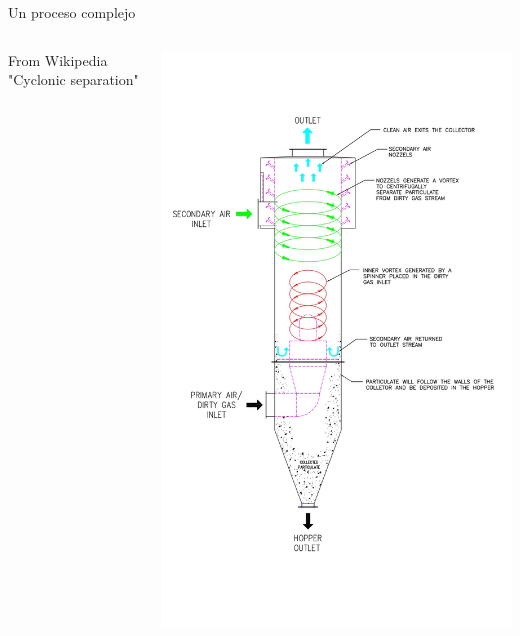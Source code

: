 \documentclass[presentation,aspectratio=169]{beamer}
\begin{document}
\begin{frame}[label={sec:orga68fad4}]{Un proceso complejo}
\begin{columns}
\begin{column}{0.6\columnwidth}
From Wikipedia "Cyclonic separation"
\end{column}
\begin{column}{0.4\columnwidth}
\begin{center}
\includegraphics[height=1.0\textheight]{../../figures/Vertical-cyclone.jpg}
\end{center}
\end{column}
\end{columns}
\end{frame}
\end{document}
